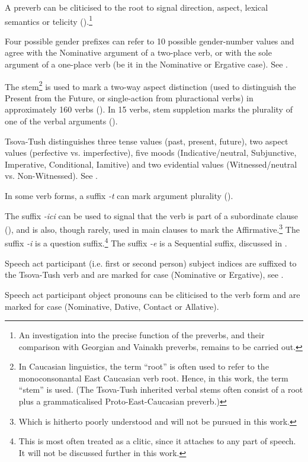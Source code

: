 \begin{description}[font=\normalfont]
\item[$-2$:] A preverb can be cliticised to the root to signal direction, aspect, lexical semantics or telicity (\cite[184]{holiskygagua}).\footnote{An investigation into the precise function of the preverbs, and their comparison with Georgian and Vainakh preverbs, remains to be carried out.}
\item[$-1$:] Four possible gender prefixes can refer to 10 possible gender-number values and agree with the Nominative argument of a two-place verb, or with the sole argument of a one-place verb (be it in the Nominative or Ergative case). See .
\item[0:] The stem\footnote{In Caucasian linguistics, the term “root” is often used to refer to the monoconsonantal East Caucasian verb root. Hence, in this work, the term “stem” is used. (The Tsova-Tush inherited verbal stems often consist of a root plus a grammaticalised Proto-East-Caucasian preverb.)} is used to mark a two-way aspect distinction (used to distinguish the Present from the Future, or single-action from pluractional verbs) in approximately 160 verbs (). In 15 verbs, stem suppletion marks the plurality of one of the verbal arguments ().
\item[1:] Tsova-Tush distinguishes three tense values (past, present, future), two aspect values (perfective vs. imperfective), five moods (Indicative/neutral, Subjunctive, Imperative, Conditional, Iamitive) and two evidential values (Witnessed/neutral vs. Non-Witnessed). See .
\item[2:] In some verb forms, a suffix \textit{-t} can mark argument plurality ().
\item[3:] The suffix \textit{-ici} can be used to signal that the verb is part of a subordinate clause (), and is also, though rarely, used in main clauses to mark the Affirmative.\footnote{Which is hitherto poorly understood and will not be pursued in this work.} The suffix \textit{-i} is a question suffix.\footnote{This is most often treated as a clitic, since it attaches to any part of speech. It will not be discussed further in this work.} The suffix \textit{-e} is a Sequential suffix, discussed in .
\item[4:] Speech act participant (i.e. first or second person) subject indices are suffixed to the Tsova-Tush verb and are marked for case (Nominative or Ergative), see .
\item[5:] Speech act participant object pronouns can be cliticised to the verb form and are marked for case (Nominative, Dative, Contact or Allative).
\end{description}


